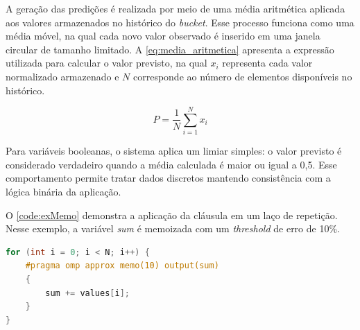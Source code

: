 A geração das predições é realizada por meio de uma média aritmética aplicada aos valores armazenados no histórico do \textit{bucket}. Esse processo funciona como uma média móvel, na qual cada novo valor observado é inserido em uma janela circular de tamanho limitado. A \autoref{eq:media_aritmetica} apresenta a expressão utilizada para calcular o valor previsto, na qual $x_i$ representa cada valor normalizado armazenado e $N$ corresponde ao número de elementos disponíveis no histórico.

\begin{equation}
\label{eq:media_aritmetica}
P = \frac{1}{N} \sum^{N}_{i = 1} x_i
\end{equation}

Para variáveis booleanas, o sistema aplica um limiar simples: o valor previsto é considerado verdadeiro quando a média calculada é maior ou igual a 0,5. Esse comportamento permite tratar dados discretos mantendo consistência com a lógica binária da aplicação.

O \autoref{code:exMemo} demonstra a aplicação da cláusula em um laço de repetição. Nesse exemplo, a variável \textit{sum} é memoizada com um \textit{threshold} de erro de 10\%.

\begin{sourcecode}[htb]
\caption{\label{code:exMemo}Exemplo de uso da cláusula \textit{memo}.}
\begin{lstlisting}[frame=single, language=C++]
for (int i = 0; i < N; i++) {
    #pragma omp approx memo(10) output(sum)
    {
        sum += values[i];
    }
}
\end{lstlisting}
\fonte{}
\end{sourcecode}